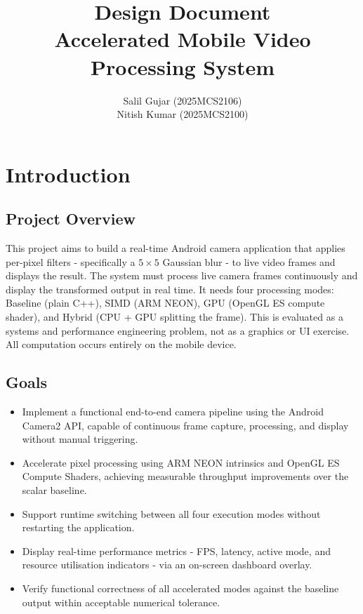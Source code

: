 \documentclass[12pt, a4paper]{article}
\title{
    \textbf{Design Document} \\
    \Large Accelerated Mobile Video Processing System \\
}
\author{
    Salil Gujar (2025MCS2106) \\
    Nitish Kumar (2025MCS2100)
}
\date{}
\begin{document}
\maketitle


\section{Introduction}

\subsection{Project Overview}
This project aims to build a real-time Android camera application that applies per-pixel
filters - specifically a $5 \times 5$ Gaussian blur - to live video frames and displays
the result. The system must process live camera frames continuously and display the
transformed output in real time. It needs four processing modes: Baseline (plain C++),
SIMD (ARM NEON), GPU (OpenGL ES compute shader), and Hybrid (CPU + GPU splitting
the frame). This is evaluated as a systems and performance engineering problem, not as
a graphics or UI exercise. All computation occurs entirely on the mobile device.

\subsection{Goals}
\begin{itemize}
    \item Implement a functional end-to-end camera pipeline using the Android Camera2 API,
          capable of continuous frame capture, processing, and display without manual triggering.
    \item Accelerate pixel processing using ARM NEON intrinsics and OpenGL ES Compute Shaders,
          achieving measurable throughput improvements over the scalar baseline.
    \item Support runtime switching between all four execution modes without restarting the
          application.
    \item Display real-time performance metrics - FPS, latency, active mode, and resource
          utilisation indicators - via an on-screen dashboard overlay.
    \item Verify functional correctness of all accelerated modes against the baseline output
          within acceptable numerical tolerance.
\end{itemize}
\end{document}
